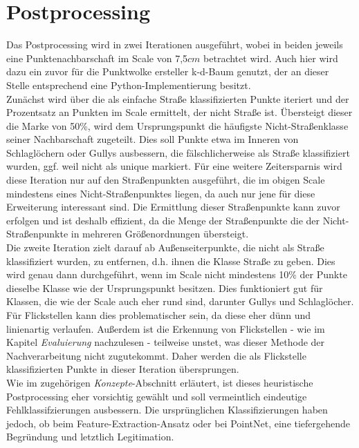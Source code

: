 \section{Postprocessing} 

Das Postprocessing wird in zwei Iterationen ausgeführt, wobei in beiden jeweils eine Punktenachbarschaft im Scale von 7,5$cm$ betrachtet wird. Auch hier wird dazu ein zuvor für die Punktwolke ersteller k-d-Baum genutzt, der an dieser Stelle entsprechend eine Python-Implementierung besitzt. \\
Zunächst wird über die als einfache Straße klassifizierten Punkte iteriert und der Prozentsatz an Punkten im Scale ermittelt, der nicht Straße ist. Übersteigt dieser die Marke von 50\%, wird dem Ursprungspunkt die häufigste Nicht-Straßenklasse seiner Nachbarschaft zugeteilt. Dies soll Punkte etwa im Inneren von Schlaglöchern oder Gullys ausbessern, die fälschlicherweise als Straße klassifiziert wurden, ggf. weil nicht als unique markiert. Für eine weitere Zeitersparnis wird diese Iteration nur auf den Straßenpunkten ausgeführt, die im obigen Scale mindestens eines Nicht-Straßenpunktes liegen, da auch nur jene für diese Erweiterung interessant sind. Die Ermittlung dieser Straßenpunkte kann zuvor erfolgen und ist deshalb effizient, da die Menge der Straßenpunkte die der Nicht-Straßenpunkte in mehreren Größenordnungen übersteigt. \\
Die zweite Iteration zielt darauf ab Außenseiterpunkte, die nicht als Straße klassifiziert wurden, zu entfernen, d.h. ihnen die Klasse Straße zu geben. Dies wird genau dann durchgeführt, wenn im Scale nicht mindestens 10\% der Punkte dieselbe Klasse wie der Ursprungspunkt besitzen. Dies funktioniert gut für Klassen, die wie der Scale auch eher rund sind, darunter Gullys und Schlaglöcher. Für Flickstellen kann dies problematischer sein, da diese eher dünn und linienartig verlaufen. Außerdem ist die Erkennung von Flickstellen - wie im Kapitel \textit{Evaluierung} nachzulesen - teilweise unstet, was dieser Methode der Nachverarbeitung nicht zugutekommt. Daher werden die als Flickstelle klassifizierten Punkte in dieser Iteration übersprungen. \\
Wie im zugehörigen \textit{Konzepte}-Abschnitt erläutert, ist dieses heuristische Postprocessing eher vorsichtig gewählt und soll vermeintlich eindeutige Fehlklassifzierungen ausbessern. Die ursprünglichen Klassifizierungen haben jedoch, ob beim Feature-Extraction-Ansatz oder bei PointNet, eine tiefergehende Begründung und letztlich Legitimation.